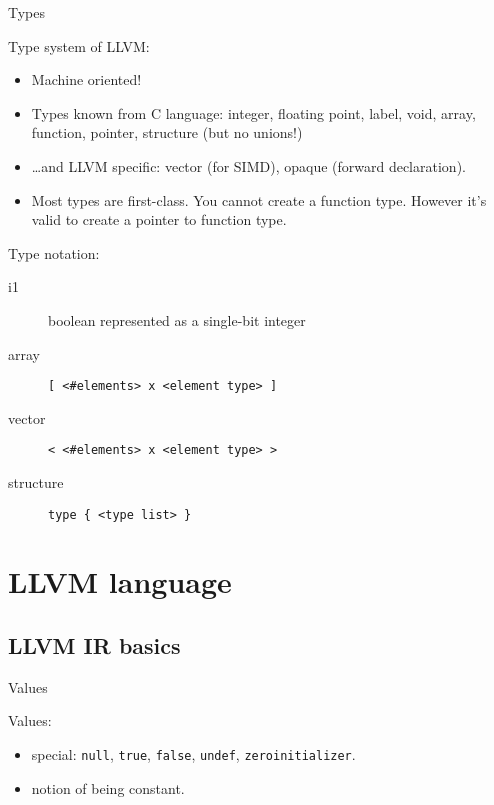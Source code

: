 \documentclass[8pt]{beamer}
\begin{document}
\begin{frame}[fragile]{Types}
  \begin{block}{Type system of LLVM:}
    \begin{itemize}
      \item Machine oriented!
      \item Types known from C language: integer, floating point, label,
        void, array, function, pointer, structure (but no unions!)
      \item \ldots and LLVM specific: vector (for SIMD), opaque (forward
        declaration).
      \item Most types are first-class. You cannot create a function type.
        However it's valid to create a pointer to function type.
    \end{itemize}
  \end{block}

  \begin{block}{Type notation:}
    \begin{description}
      \item[i1] boolean represented as a single-bit integer
      \item[array] \verb+[ <#elements> x <element type> ]+
      \item[vector] \verb+< <#elements> x <element type> >+
      \item[structure] \verb+type { <type list> }+
    \end{description}
  \end{block}
\end{frame}

\section[Language]{LLVM language}
\subsection*{LLVM IR basics}

\begin{frame}[fragile]{Values}
  \begin{block}{Values:}
    \begin{itemize}
      \item special: \verb+null+, \verb+true+, \verb+false+, \verb+undef+,
        \verb+zeroinitializer+.
      \item notion of being constant.
    \end{itemize}
  \end{block}
\end{frame}
\end{document}
